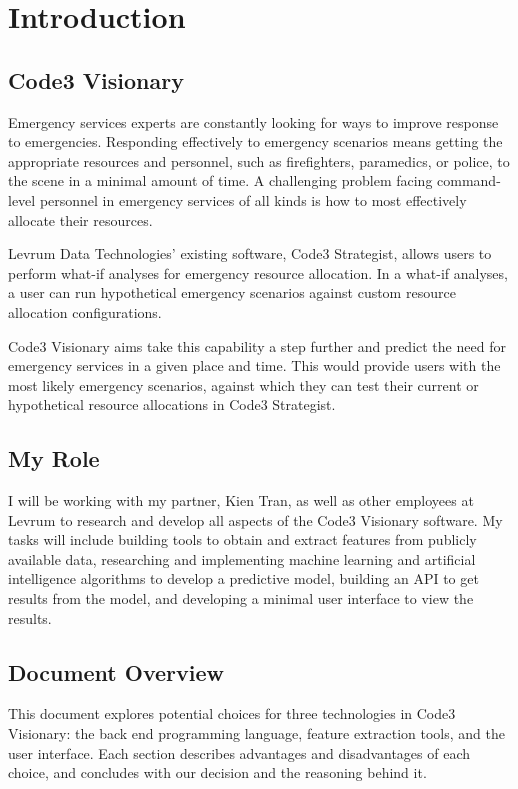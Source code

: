 \documentclass[onecolumn, draftclsnofoot,10pt, compsoc]{IEEEtran}
\begin{document}
\section{Introduction}
    \subsection{Code3 Visionary}
    Emergency services experts are constantly looking for ways to improve response to emergencies.
    Responding effectively to emergency scenarios means getting the appropriate resources and personnel, such as firefighters, paramedics, or police, to the scene in a minimal amount of time.
    A challenging problem facing command-level personnel in emergency services of all kinds is how to most effectively allocate their resources.
    
    Levrum Data Technologies' existing software, Code3 Strategist, allows users to perform what-if analyses for emergency resource allocation.
    In a what-if analyses, a user can run hypothetical emergency scenarios against custom resource allocation configurations.
    
    Code3 Visionary aims take this capability a step further and predict the need for emergency services in a given place and time.
    This would provide users with the most likely emergency scenarios, against which they can test their current or hypothetical resource allocations in Code3 Strategist.
    
    \subsection{My Role}
    I will be working with my partner, Kien Tran, as well as other employees at Levrum to research and develop all aspects of the Code3 Visionary software.
    My tasks will include building tools to obtain and extract features from publicly available data, researching and implementing machine learning and artificial intelligence algorithms to develop a predictive model, building an API to get results from the model, and developing a minimal user interface to view the results.

    \subsection{Document Overview}
    This document explores potential choices for three technologies in Code3 Visionary: the back end programming language, feature extraction tools, and the user interface.
    Each section describes advantages and disadvantages of each choice, and concludes with our decision and the reasoning behind it.
    
\end{document}
